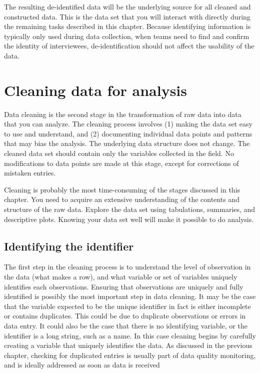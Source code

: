 The resulting de-identified data will be the underlying source for all cleaned and constructed data.
This is the data set that you will interact with directly during the remaining tasks described in this chapter.
Because identifying information is typically only used during data collection,
when teams need to find and confirm the identity of interviewees,
de-identification should not affect the usability of the data.

\section{Cleaning data for analysis}

Data cleaning is the second stage in the transformation of raw data into data that you can analyze.
The cleaning process involves (1) making the data set easy to use and understand,
and (2) documenting individual data points and patterns that may bias the analysis.
The underlying data structure does not change.
The cleaned data set should contain only the variables collected in the field.
No modifications to data points are made at this stage, except for corrections of mistaken entries.

Cleaning is probably the most time-consuming of the stages discussed in this chapter.
You need to acquire an extensive understanding of the contents and structure of the raw data.
Explore the data set using tabulations, summaries, and descriptive plots.
Knowing your data set well will make it possible to do analysis.

\subsection{Identifying the identifier}

The first step in the cleaning process is to understand the level of observation in the data (what makes a row),
and what variable or set of variables uniquely identifies each observations.
Ensuring that observations are uniquely and fully identified
is possibly the most important step in data cleaning.
It may be the case that the variable expected to be the unique identifier in fact is either incomplete or contains duplicates.
This could be due to duplicate observations or errors in data entry.
It could also be the case that there is no identifying variable, or the identifier is a long string, such as a name.
In this case cleaning begins by carefully creating a variable that uniquely identifies the data.
As discussed in the previous chapter,
checking for duplicated entries is usually part of data quality monitoring,
and is ideally addressed as soon as data is received

